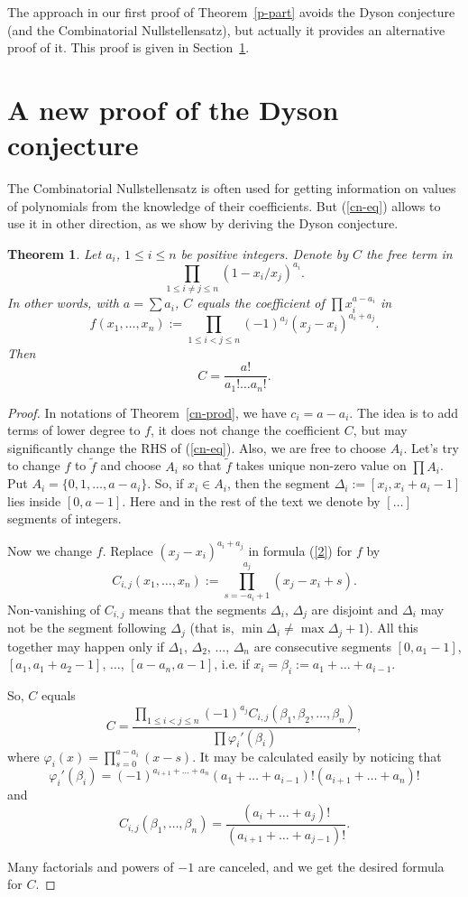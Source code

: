 \documentclass[12pt,a4paper]{amsart}
\newtheorem{thm}{Theorem}
\theoremstyle{definition}
\theoremstyle{remark}
\begin{document}
The approach in our first proof of Theorem~\ref{p-part} avoids the Dyson conjecture (and the Combinatorial Nullstellensatz), but actually it provides an alternative proof of it. This proof is given in Section~\ref{dyson-sec}.

\section{A new proof of the Dyson conjecture}
\label{dyson-sec}

The Combinatorial Nullstellensatz is often used for getting information on values of polynomials from the knowledge of their coefficients. But (\ref{cn-eq}) allows to use it in other direction, as we show by deriving the Dyson conjecture.

\begin{thm}
\label{dyson}
Let $a_i$, $1\leq i\leq n$ be positive integers. Denote by $C$ the free term in
$$
\prod_{1\le i\ne j\le n} (1-x_i/x_j)^{a_i}.
$$
In other words, with $a=\sum a_i$, $C$ equals the coefficient of
$\prod x_i^{a-a_i}$ in
\begin{equation}\label{2}
f(x_1,\dots,x_n):=\prod_{1\leq i<j\leq n} (-1)^{a_j}(x_j-x_i)^{a_i+a_j}.
\end{equation}
Then
$$
C=\frac{a!}{a_1!\dots a_n!}.
$$
\end{thm}

\begin{proof} In notations of Theorem~\ref{cn-prod}, we have $c_i=a-a_i$. The idea is to add terms of lower degree to $f$, it does not change the coefficient $C$, but may significantly change the RHS of (\ref{cn-eq}). Also, we are free to choose $A_i$. Let's try to change $f$ to $\tilde{f}$ and choose $A_i$ so that $\tilde{f}$ takes unique non-zero value on $\prod A_i$. Put $A_i=\{0,1,\dots,a-a_i\}$. So,
if $x_i\in A_i$, then the segment $\Delta_i:=[x_i,x_i+a_i-1]$ lies inside $[0,a-1]$. Here and in the rest of the text we denote by $[\ldots]$ segments of integers.

Now we change $f$. Replace $(x_j-x_i)^{a_i+a_j}$ in formula (\ref{2}) for $f$ by
$$
C_{i,j}(x_1,\dots,x_n):=\prod_{s=-a_i+1}^{a_j} (x_j-x_i+s).
$$
Non-vanishing of $C_{i,j}$ means that the segments $\Delta_i$, $\Delta_j$ are disjoint
and $\Delta_i$ may not be the segment following $\Delta_j$
(that is, $\min \Delta_i\ne \max \Delta_j+1$).
All this together may happen only if $\Delta_1$, $\Delta_2$, $\dots$, $\Delta_n$
are consecutive segments $[0,a_1-1]$, $[a_1,a_1+a_2-1]$, $\dots$, $[a-a_n,a-1]$,
i.e. if $x_i=\beta_i:=a_1+\dots+a_{i-1}$.

So, $C$ equals
$$C=\frac{\prod_{1\leq i<j\leq n} (-1)^{a_j} C_{i,j}(\beta_1, \beta_2, \dots,\beta_n)}
{\prod \varphi_i'(\beta_i)},$$
where $\varphi_i(x)=\prod_{s=0}^{a-a_i} (x-s)$.
It may be calculated easily by noticing that
$$
\varphi_i'(\beta_i) = (-1)^{a_{i+1}+\dots+a_n} (a_1+\dots+a_{i-1})!(a_{i+1}+\dots+a_n)!
$$
and
$$
C_{i,j}(\beta_1,\dots,\beta_n)=\frac{(a_i+\dots+a_j)!}{(a_{i+1}+\dots+a_{j-1})!}.
$$

Many factorials and powers of $-1$ are canceled, and we get the
desired formula for $C$.

\end{proof}
\end{document}
